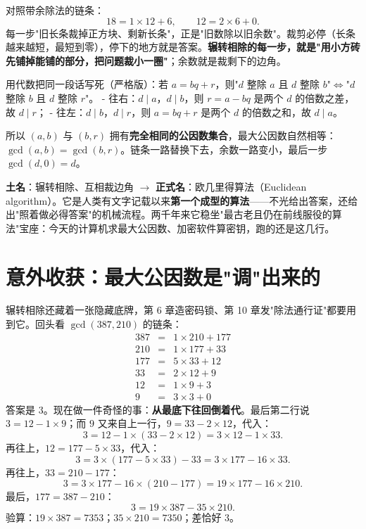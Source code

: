 对照带余除法的链条：
\[
18 = 1\times 12 + 6,\qquad 12 = 2\times 6 + 0 .
\]
每一步"旧长条裁掉正方块、剩新长条"，正是"旧数除以旧余数"。裁剪必停（长条越来越短，最短到零），停下的地方就是答案。\textbf{辗转相除的每一步，就是"用小方砖先铺掉能铺的部分，把问题裁小一圈"}；余数就是裁剩下的边角。

用代数把同一段话写死（严格版）：若 $a = bq + r$，则"$d$ 整除 $a$ 且 $d$ 整除 $b$"$\iff$"$d$ 整除 $b$ 且 $d$ 整除 $r$"。
- 往右：$d\mid a$，$d\mid b$，则 $r = a - bq$ 是两个 $d$ 的倍数之差，故 $d \mid r$；
- 往左：$d\mid b$，$d\mid r$，则 $a = bq + r$ 是两个 $d$ 的倍数之和，故 $d\mid a$。

所以 $(a, b)$ 与 $(b, r)$ 拥有\textbf{完全相同的公因数集合}，最大公因数自然相等：$\gcd(a,b) = \gcd(b,r)$。链条一路替换下去，余数一路变小，最后一步 $\gcd(d, 0) = d$。

\begin{faming}
\textbf{土名}：辗转相除、互相裁边角 $\to$ \textbf{正式名}：欧几里得算法（Euclidean algorithm）。它是人类有文字记载以来\textbf{第一个成型的算法}——不光给出答案，还给出"照着做必得答案"的机械流程。两千年来它稳坐"最古老且仍在前线服役的算法"宝座：今天的计算机求最大公因数、加密软件算密钥，跑的还是这几行。
\end{faming}

\section{意外收获：最大公因数是"调"出来的}

辗转相除还藏着一张隐藏底牌，第 6 章造密码锁、第 10 章发"除法通行证"都要用到它。回头看 $\gcd(387, 210)$ 的链条：
\[
\begin{array}{rcl}
387 & = & 1\times 210 + 177 \\
210 & = & 1\times 177 + 33 \\
177 & = & 5\times 33 + 12 \\
33 & = & 2\times 12 + 9 \\
12 & = & 1\times 9 + 3 \\
9 & = & 3\times 3 + 0
\end{array}
\]
答案是 $3$。现在做一件奇怪的事：\textbf{从最底下往回倒着代}。最后第二行说 $3 = 12 - 1\times 9$；而 $9$ 又来自上一行，$9 = 33 - 2\times 12$，代入：
\[
3 = 12 - 1\times(33 - 2\times 12) = 3\times 12 - 1\times 33 .
\]
再往上，$12 = 177 - 5\times 33$，代入：
\[
3 = 3\times(177 - 5\times 33) - 33 = 3\times 177 - 16\times 33 .
\]
再往上，$33 = 210 - 177$：
\[
3 = 3\times 177 - 16\times(210 - 177) = 19\times 177 - 16\times 210 .
\]
最后，$177 = 387 - 210$：
\[
\boxed{3 = 19\times 387 - 35\times 210 .}
\]
验算：$19 \times 387 = 7353$；$35\times 210 = 7350$；差恰好 $3$。\checkmark

